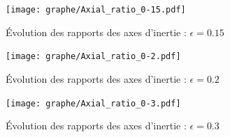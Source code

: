 \begin{figure}[h!]
	\centering \texttt{[image: graphe/Axial\_ratio\_0-15.pdf]}
	\caption{Évolution des rapports des axes d'inertie : $\epsilon = 0.15$\label{soft::0.15-Ax}}
\end{figure}


\begin{figure}[h!]
	\centering \texttt{[image: graphe/Axial\_ratio\_0-2.pdf]}
	\caption{Évolution des rapports des axes d'inertie : $\epsilon = 0.2$\label{soft::0.2-Ax}}
\end{figure}


\begin{figure}[h!]
	\centering \texttt{[image: graphe/Axial\_ratio\_0-3.pdf]}
	\caption{Évolution des rapports des axes d'inertie : $\epsilon = 0.3$\label{soft::0.3-Ax}}
\end{figure}

